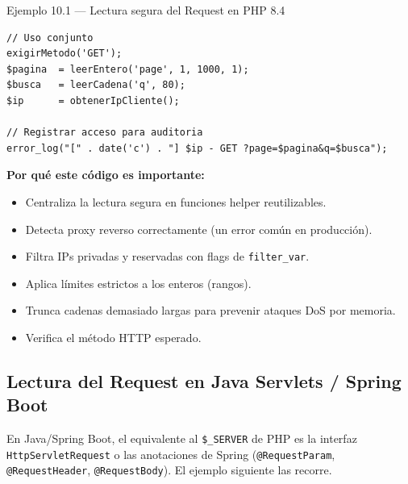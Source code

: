 \begin{cajaejemplo}{Ejemplo 10.1 --- Lectura segura del Request en PHP 8.4}
\begin{lstlisting}[style=php,caption={request-helpers.php},label=lst:10.4]
// Uso conjunto
exigirMetodo('GET');
$pagina  = leerEntero('page', 1, 1000, 1);
$busca   = leerCadena('q', 80);
$ip      = obtenerIpCliente();

// Registrar acceso para auditoria
error_log("[" . date('c') . "] $ip - GET ?page=$pagina&q=$busca");
\end{lstlisting}

\textbf{Por qué este código es importante:}
\begin{itemize}
\item Centraliza la lectura segura en funciones helper reutilizables.
\item Detecta proxy reverso correctamente (un error común en
producción).
\item Filtra IPs privadas y reservadas con flags de
\texttt{filter\_var}.
\item Aplica límites estrictos a los enteros (rangos).
\item Trunca cadenas demasiado largas para prevenir ataques DoS por
memoria.
\item Verifica el método HTTP esperado.
\end{itemize}
\end{cajaejemplo}

\subsection{Lectura del Request en Java Servlets / Spring Boot}

En Java/Spring Boot, el equivalente al \texttt{\$\_SERVER}
de PHP es la interfaz \texttt{HttpServletRequest} o las anotaciones
de Spring (\texttt{@RequestParam}, \texttt{@RequestHeader},
\texttt{@RequestBody}). El ejemplo siguiente las recorre.


